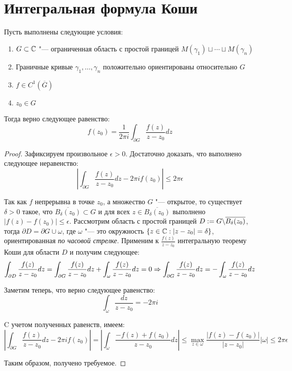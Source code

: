 \section{Интегральная формула Коши}

\begin{theorem}
	Пусть выполнены следующие условия:
	\begin{enumerate}
		\item $G \subset \mathbb{C}$ "--- ограниченная область с простой границей $M(\gamma_1) \sqcup \dotsb \sqcup M(\gamma_n)$
		
		\item Граничные кривые $\gamma_1, \dotsc, \gamma_n$ положительно ориентированы относительно $G$
		
		\item $f \in C^1(\overline{G})$
		
		\item $z_0 \in G$
	\end{enumerate}
	
	Тогда верно следующее равенство:
	\[f(z_0) = \frac{1}{2\pi i}\int_{\partial G}\frac{f(z)}{z - z_0}dz\]
\end{theorem}

\begin{proof}
	Зафиксируем произвольное $\epsilon > 0$. Достаточно доказать, что выполнено следующее неравенство:
	\[\left|\int_{\partial G}\frac{f(z)}{z - z_0}dz - 2\pi if(z_0)\right| \le 2\pi\epsilon\]
	
	Так как $f$ непрерывна в точке $z_0$, а множество $G$ "--- открытое, то существует $\delta > 0$ такое, что $\overline{B_\delta(z_0)} \subset G$ и для всех $z \in \overline{B_\delta(z_0)}$ выполнено $|f(z) - f(z_0)| \le \epsilon$. Рассмотрим область с простой границей $D := G \backslash \overline{B_\delta(z_0)}$, тогда $\partial D = \partial G \cup \omega$, где $\omega$ "--- это окружность $\{z \in \mathbb{C}: |z - z_0| = \delta\}$, ориентированная \textit{по часовой стрелке}. Применим к $\frac{f(z)}{z - z_0}$ интегральную теорему Коши для области $D$ и получим следующее:
	\[\int_{\partial D}\frac{f(z)}{z - z_0}dz = \int_{\partial G}\frac{f(z)}{z - z_0}dz + \int_{\omega}\frac{f(z)}{z - z_0}dz = 0 \Rightarrow \int_{\partial G}\frac{f(z)}{z - z_0}dz = -\int_{\omega}\frac{f(z)}{z - z_0}dz\]
	
	Заметим теперь, что верно следующее равенство:
	\[\int_{\omega}\frac{dz}{z - z_0} = -2\pi i\]
	
	C учетом полученных равенств, имеем:
	\[\left|\int_{\partial G}\frac{f(z)}{z - z_0}dz - 2\pi if(z_0)\right| = \left|\int_{\omega}\frac{-f(z) + f(z_0)}{z - z_0}dz\right| \le \max_{z \in \omega}\frac{|f(z) - f(z_0)|}{|z - z_0|}|\omega| \le 2\pi\epsilon\]
	
	Таким образом, получено требуемое.
\end{proof}

